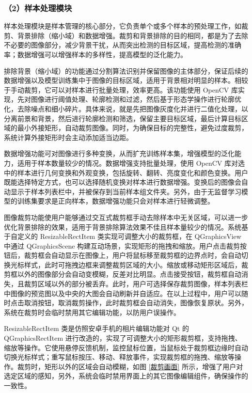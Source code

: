 \documentclass[
  ]{njuthesis}
\begin{document}
\subsubsection{（2）样本处理模块}

样本处理模块是样本管理的核心部分，它负责单个或多个样本的预处理工作，如裁剪、背景排除（缩小域）和数据增强。裁剪和背景排除的目的相同，都是为了去除不必要的图像部分，减少背景干扰，从而突出检测的目标区域，提高检测的准确率；数据增强可以增强样本的多样性，提高模型的泛化能力。

排除背景（缩小域）的功能通过分割算法识别并保留图像的主体部分，保证后续的数据增强以及模型训练集中于图像的目标区域，适用于背景相对明显的样本。相较于手动裁剪，它可以对样本进行批量处理，效率更高。该功能使用 OpenCV 库实现，先对图像进行阈值处理、轮廓检测和过滤，然后基于形态学操作进行轮廓优化，去除噪点和细小碎片。具体来说，就是先把图像灰度化并进行二值化处理，以分离前景和背景，然后进行轮廓检测和筛选，保留主要目标区域，最后计算目标区域的最小外接矩形，自动裁剪图像。同时，为确保目标的完整性，避免过度裁剪，系统计算外接矩形时会主动添加适当边距。

数据增强功能可对图像进行多种变换，从而扩充训练样本集，增强模型的泛化能力，适用于样本数量较少的情况。数据增强支持批量处理，使用 OpenCV 库对选中的样本进行几何变换和外观变换，包括旋转、翻转、亮度变化和颜色变换。用户既能选择特定方式，也可以选择随机变换对样本进行数据增强。变换后的图像会自动显示于样本列表栏中，并被保存到当前样本组文件夹。另外，由于无监督学习模型的训练集要求是正向样本，数据增强功能只会对样本进行轻微调整。

图像裁剪功能使用户能够通过交互式裁剪框手动去除样本中无关区域，可以进一步优化背景排除的效果，适用于背景排除算法效果不佳且样本量较少的情况。系统基于自定义的 ResizableRectItem 类实现可调整大小的裁剪框，在 QGraphicsView 中通过 QGraphicsScene 构建互动场景，实现矩形的拖拽和缩放。用户点击裁剪按钮后，裁剪框会自动显示在图像上，用户将鼠标移至裁剪框的边界点时，会自动切换光标样式，此时可拖拽边框来调整裁剪区域的大小。缩放或移动矩形区域后，裁剪框以外的图像部分会自动变模糊，反差对比明显。点击接受按钮，裁剪框自动消失，且裁剪区域以外的部分被丢弃。此时，用户可选择保存裁剪图像，样本列表栏中图像的预览图以及中央的大图会自动刷新并自适应。在以上过程中，用户可以随时点击取消按钮，取消裁剪操作，此时裁剪框会自动消失，图像恢复原状。另外，系统在裁剪时会临时禁用其它编辑功能，以防用户误操作。

ResizableRectItem 类是仿照安卓手机的相片编辑功能对 Qt 的 QGraphicsRectItem 进行改造的，实现了可调整大小的矩形裁剪框，支持拖拽、缩放等操作。它使用悬停反馈机制，监控鼠标位置，当鼠标处于裁剪框边缘时自动切换光标样式；重写鼠标按压、移动、释放事件，实现裁剪框的拖拽、缩放等操作。裁剪时，矩形以外的区域会自动模糊，如图 \ref{裁剪画面} 所示，增强了用户对选定区域的感知，另外，系统会临时禁用界面上的其它图像编辑组件，确保操作的一致性。
\end{document}
